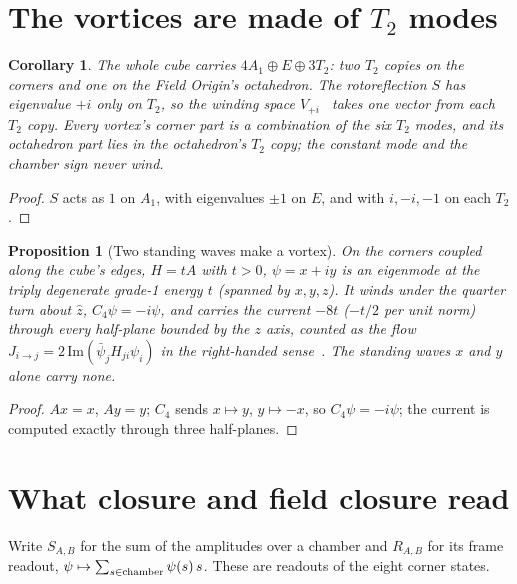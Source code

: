 \documentclass[twocolumn]{iopjournal}
\newtheorem{proposition}{Proposition}
\newtheorem{corollary}{Corollary}
\theoremstyle{definition}
\theoremstyle{remark}
\begin{document}

\section{The vortices are made of $T_2$ modes}

\begin{corollary}
The whole cube carries $4A_1 \oplus E \oplus 3T_2$: two $T_2$ copies on the
corners and one on the Field Origin's octahedron. The rotoreflection $S$
has eigenvalue $+i$ only on $T_2$, so the winding space
$V_{+i}$~\cite{NelsonVortex} takes one vector from each $T_2$ copy. Every
vortex's corner part is a combination of the six $T_2$ modes, and its
octahedron part lies in the octahedron's $T_2$ copy; the constant mode and
the chamber sign never wind.
\end{corollary}

\begin{proof}
$S$ acts as $1$ on $A_1$, with eigenvalues $\pm1$ on $E$, and with $i, -i,
-1$ on each $T_2$.
\end{proof}

\begin{proposition}[Two standing waves make a vortex]
\label{prop:cube}
On the corners coupled along the cube's edges, $H = tA$ with $t > 0$, $\psi = x + iy$ is an eigenmode at
the triply degenerate grade-1 energy $t$ (spanned by $x, y, z$). It winds
under the quarter turn about $\hat z$, $C_4\psi = -i\psi$, and carries the
current $-8t$ ($-t/2$ per unit norm) through every half-plane bounded by
the $z$ axis, counted as the flow $J_{i\to j} =
2\,\mathrm{Im}(\bar\psi_jH_{ji}\psi_i)$ in the right-handed
sense~\cite{NelsonVortex}. The standing waves $x$ and $y$ alone carry none.
\end{proposition}

\begin{proof}
$Ax = x$, $Ay = y$; $C_4$ sends $x \mapsto y$, $y \mapsto -x$, so $C_4\psi =
-i\psi$; the current is computed exactly through three half-planes.
\end{proof}


\section{What closure and field closure read}

Write $S_{A,B}$ for the sum of the amplitudes over a chamber and $R_{A,B}$
for its frame readout, $\psi \mapsto \sum_{s\in{\rm chamber}}\psi(s)\,s$.
These are readouts of the eight corner states.
\end{document}
